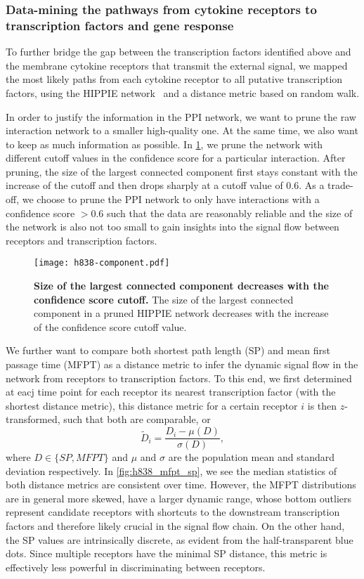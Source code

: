 \subsubsection{Data-mining the pathways from cytokine receptors to transcription factors and gene response}

To further bridge the gap between the transcription factors identified above and the membrane cytokine receptors that 
transmit the external signal,
we mapped the most likely paths from each cytokine receptor to all putative 
transcription factors, using the HIPPIE network~\citep{Schaefer2012} and a 
distance metric based on random walk.

In order to justify the information in the PPI network, we want to prune the
raw interaction network to a smaller
high-quality one. At the same time, we also want to keep as 
much information as possible. In \ref{fig:h838_component}, we prune the 
network with different cutoff values in the confidence score for a particular
interaction. After pruning, the
size of the largest connected component first stays constant with the increase 
of the cutoff and then drops
sharply at a cutoff value of 0.6. As a trade-off, we choose to prune the PPI network
to only have interactions with a confidence score $>0.6$ such that the data
are reasonably reliable and the size of the network is also not too small to
gain insights into the signal flow between receptors and transcription factors.

\begin{figure}[!ht]
\begin{center}
\texttt{[image: h838-component.pdf]}
\end{center}
\caption[Confidence score cutoff]{
{\bf Size of the largest connected component decreases with the confidence
score cutoff.} 
The size of the largest connected component in a pruned HIPPIE network decreases
with the increase of the confidence score cutoff value.
}
\label{fig:h838_component}
\end{figure}

We further want to compare both shortest path length (SP) and mean first 
passage time (MFPT) as a distance metric to infer the dynamic signal flow
in the network from receptors to transcription factors. To this end, we
first determined at eacj time point for each receptor its nearest transcription factor (with
the shortest distance metric), this distance metric for a certain receptor
$i$ is then $z$-transformed, such that both are comparable, or
\[
\tilde{D}_{i} = \frac{D_{i}-\mu(D)}{\sigma(D)}, 
\]
where $D \in \{SP,MFPT\}$ and $\mu$ and $\sigma$ are the population mean and 
standard deviation respectively. In \ref{fig:h838_mfpt_sp}, we see the median
statistics of both distance metrics are consistent over time. However, the 
MFPT distributions are in general more skewed, have a larger dynamic range,
whose bottom outliers represent candidate receptors with shortcuts to the
downstream transcription factors and therefore likely crucial in the signal
flow chain. On the other hand, the SP values are intrinsically discrete, as
evident from the half-transparent blue dots. Since multiple receptors have
the minimal SP distance, this metric is effectively less powerful in
discriminating between receptors.

